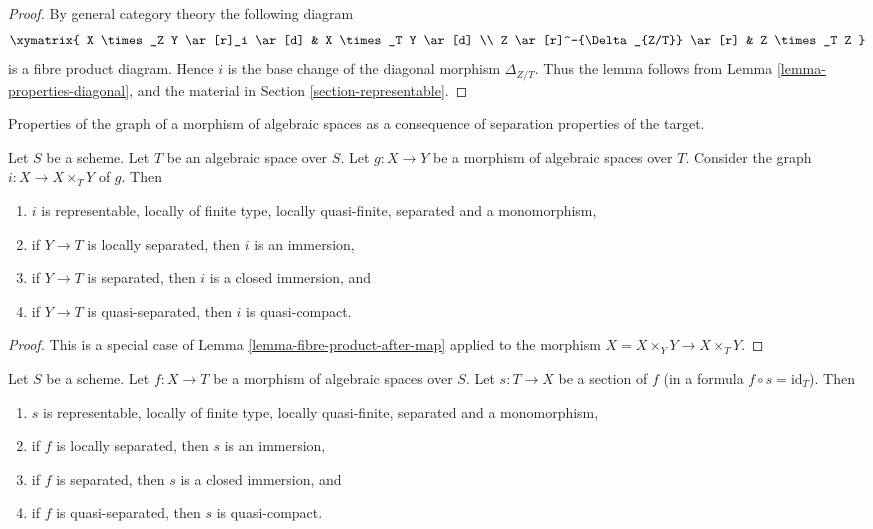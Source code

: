 \begin{proof}
By general category theory the following diagram
$$
\xymatrix{
X \times_Z Y \ar[r]_i \ar[d] & X \times_T Y \ar[d] \\
Z \ar[r]^-{\Delta_{Z/T}} \ar[r] & Z \times_T Z
}
$$
is a fibre product diagram. Hence $i$ is the base change of the
diagonal morphism $\Delta_{Z/T}$. Thus the lemma follows
from Lemma \ref{lemma-properties-diagonal}, and the material in
Section \ref{section-representable}.
\end{proof}

\begin{lemma}
\label{lemma-semi-diagonal}
\begin{slogan}
Properties of the graph of a morphism of algebraic spaces
as a consequence of separation properties of the target.
\end{slogan}
Let $S$ be a scheme. Let $T$ be an algebraic space over $S$.
Let $g : X \to Y$ be a morphism of algebraic spaces over $T$.
Consider the graph $i : X \to X \times_T Y$ of $g$. Then
\begin{enumerate}
\item $i$ is representable, locally of finite type, locally quasi-finite,
separated and a monomorphism,
\item if $Y \to T$ is locally separated, then $i$ is an immersion,
\item if $Y \to T$ is separated, then $i$ is a closed immersion, and
\item if $Y \to T$ is quasi-separated, then $i$ is quasi-compact.
\end{enumerate}
\end{lemma}

\begin{proof}
This is a special case of Lemma \ref{lemma-fibre-product-after-map}
applied to the morphism $X = X \times_Y Y \to X \times_T Y$.
\end{proof}

\begin{lemma}
\label{lemma-section-immersion}
Let $S$ be a scheme.
Let $f : X \to T$ be a morphism of algebraic spaces over $S$.
Let $s : T \to X$ be a section of $f$ (in a formula
$f \circ s = \text{id}_T$). Then
\begin{enumerate}
\item $s$ is representable, locally of finite type, locally quasi-finite,
separated and a monomorphism,
\item if $f$ is locally separated, then $s$ is an immersion,
\item if $f$ is separated, then $s$ is a closed immersion, and
\item if $f$ is quasi-separated, then $s$ is quasi-compact.
\end{enumerate}
\end{lemma}

